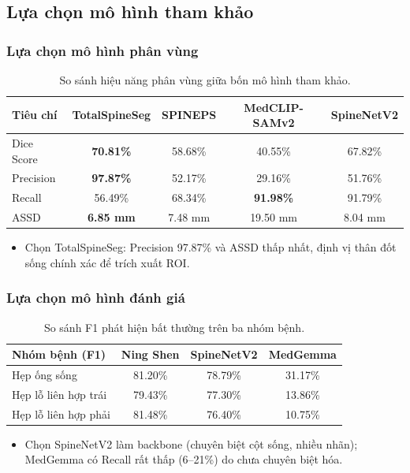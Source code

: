 \documentclass{beamer}
\numberwithin{figure}{section}
\numberwithin{table}{section}
\begin{document}
\subsection{Lựa chọn mô hình tham khảo}
\begin{frame}
\frametitle{Lựa chọn mô hình phân vùng}
\begin{table}
\centering
\small
\begin{tabular}{lcccc}
\toprule
\textbf{Tiêu chí} & \textbf{TotalSpineSeg} & \textbf{SPINEPS} & \textbf{MedCLIP-SAMv2} & \textbf{SpineNetV2} \\
\midrule
Dice Score & \textbf{70.81\%} & 58.68\% & 40.55\% & 67.82\% \\
Precision  & \textbf{97.87\%} & 52.17\% & 29.16\% & 51.76\% \\
Recall     & 56.49\% & 68.34\% & \textbf{91.98\%} & 91.79\% \\
ASSD       & \textbf{6.85 mm} & 7.48 mm & 19.50 mm & 8.04 mm \\
\bottomrule
\end{tabular}
\caption{So sánh hiệu năng phân vùng giữa bốn mô hình tham khảo.}
\end{table}
\begin{itemize}
    \item[$\rightarrow$] Chọn TotalSpineSeg: Precision 97.87\% và ASSD thấp nhất, định vị thân đốt sống chính xác để trích xuất ROI.
\end{itemize}
\end{frame}

\begin{frame}
\frametitle{Lựa chọn mô hình đánh giá}
\begin{table}
\centering
\begin{tabular}{lccc}
\toprule
\textbf{Nhóm bệnh (F1)} & \textbf{Ning Shen} & \textbf{SpineNetV2} & \textbf{MedGemma} \\
\midrule
Hẹp ống sống          & 81.20\% & 78.79\% & 31.17\% \\
Hẹp lỗ liên hợp trái  & 79.43\% & 77.30\% & 13.86\% \\
Hẹp lỗ liên hợp phải  & 81.48\% & 76.40\% & 10.75\% \\
\bottomrule
\end{tabular}
\caption{So sánh F1 phát hiện bất thường trên ba nhóm bệnh.}
\end{table}
\begin{itemize}
    \item[$\rightarrow$] Chọn SpineNetV2 làm backbone (chuyên biệt cột sống, nhiều nhãn); MedGemma có Recall rất thấp (6--21\%) do chưa chuyên biệt hóa.
\end{itemize}
\end{frame}
\end{document}
